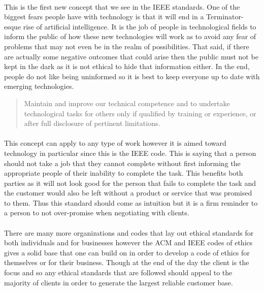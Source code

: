 \documentclass[notitlepage,a4paper,12pt]{article}
\begin{document}
\paragraph{}This is the first new concept that we see in the IEEE standards. One of the biggest fears people have with technology is that it will end in a Terminator-esque rise of artificial intelligence. It is the job of people in technological fields to inform the public of how these new technologies will work as to avoid any fear of problems that may not even be in the realm of possibilities. That said, if there are actually some negative outcomes that could arise then the public must not be kept in the dark as it is not ethical to hide that information either. In the end, people do not like being uninformed so it is best to keep everyone up to date with emerging technologies.
	\begin{quote}
	Maintain and improve our technical competence and to undertake technological tasks for others only if qualified by training or experience, or after full disclosure of pertinent limitations.
	\end{quote}
\paragraph{}This concept can apply to any type of work however it is aimed toward technology in particular since this is the IEEE code. This is saying that a person should not take a job that they cannot complete without first informing the appropriate people of their inability to complete the task. This benefits both parties as it will not look good for the person that fails to complete the task and the customer would also be left without a product or service that was promised to them. Thus this standard should come as intuition but it is a firm reminder to a person to not over-promise when negotiating with clients.
\paragraph{}There are many more organizations and codes that lay out ethical standards for both individuals and for businesses however the ACM and IEEE codes of ethics gives a solid base that one can build on in order to develop a code of ethics for themselves or for their business. Though at the end of the day the client is the focus and so any ethical standards that are followed should appeal to the majority of clients in order to generate the largest reliable customer base.
\end{document}
